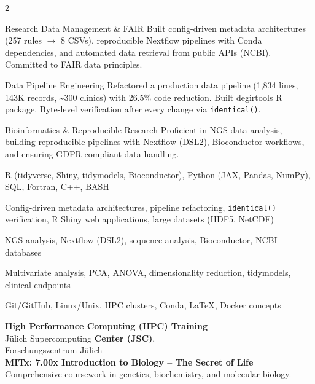 \documentclass{thejus_cv}
\begin{document}
\begin{paracol}{2}
\switchcolumn



\cvstrength{\faDatabase}
           {Research Data Management \& FAIR}
           {Built config-driven metadata architectures (257 rules $\to$ 8 CSVs), reproducible Nextflow pipelines with Conda dependencies, and automated data retrieval from public APIs (NCBI). Committed to FAIR data principles.}

\cvstrength{\faStar}
           {Data Pipeline Engineering}
           {Refactored a production data pipeline (1,834 lines, 143K records, \textasciitilde300 clinics) with 26.5\% code reduction. Built degirtools R package. Byte-level verification after every change via \texttt{identical()}.}

\cvstrength{\faAward}
           {Bioinformatics \& Reproducible Research}
           {Proficient in NGS data analysis, building reproducible pipelines with Nextflow (DSL2), Bioconductor workflows, and ensuring GDPR-compliant data handling.}


         {R (tidyverse, Shiny, tidymodels, Bioconductor), Python (JAX, Pandas, NumPy), SQL, Fortran, C++, BASH}

         {Config-driven metadata architectures, pipeline refactoring, \texttt{identical()} verification, R Shiny web applications, large datasets (HDF5, NetCDF)}

         {NGS analysis, Nextflow (DSL2), sequence analysis, Bioconductor, NCBI databases}

         {Multivariate analysis, PCA, ANOVA, dimensionality reduction, tidymodels, clinical endpoints}

         {Git/GitHub, Linux/Unix, HPC clusters, Conda, LaTeX, Docker concepts}


\textbf{High Performance Computing (HPC) Training}\\
J\"ulich Supercomputing \textbf{Center (JSC)},\\
Forschungszentrum J\"ulich\\[0.3cm]

\textbf{MITx: 7.00x Introduction to Biology -- The Secret of Life}\\
{\small Comprehensive coursework in genetics, biochemistry, and molecular biology.}\\[0.4cm]


\end{paracol}
\end{document}
